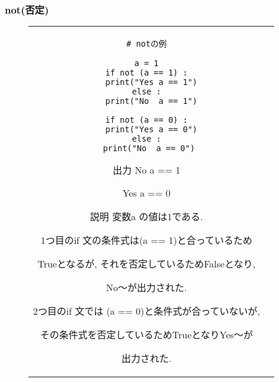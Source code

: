 \documentclass{jsarticle}
\begin{document}
\subsubsection{not(否定)}
\vspace{-5mm}
\begin{figure}[h]
	\begin{tabular}{cc}
		\begin{minipage}[t]{.4\textwidth}
			\begin{lstlisting}[caption=not]
# notの例

a = 1
if not (a == 1) :
  print("Yes a == 1")
else :
  print("No  a == 1")

if not (a == 0) :
  print("Yes a == 0")
else :
  print("No  a == 0") \end{lstlisting}
		\end{minipage} \hspace{5mm}
		\begin{minipage}[t]{.6\textwidth}
			\begin{minipage}[t]{.3\textwidth}
				\begin{itembox}[l]{出力}
					No a == 1 \par
					Yes a == 0 \par
				\end{itembox}
			\end{minipage}
			\begin{itembox}[l]{説明}
				変数a の値は1である.  \par
				1つ目のif 文の条件式は(a == 1)と合っているため \par Trueとなるが, それを否定しているためFalseとなり,  \par No～が出力された. \par
				2つ目のif 文では (a == 0)と条件式が合っていないが,  \par その条件式を否定しているためTrueとなりYes～が \par 出力された.
			\end{itembox}
		\end{minipage}
	\end{tabular}
\end{figure}

\end{document}
